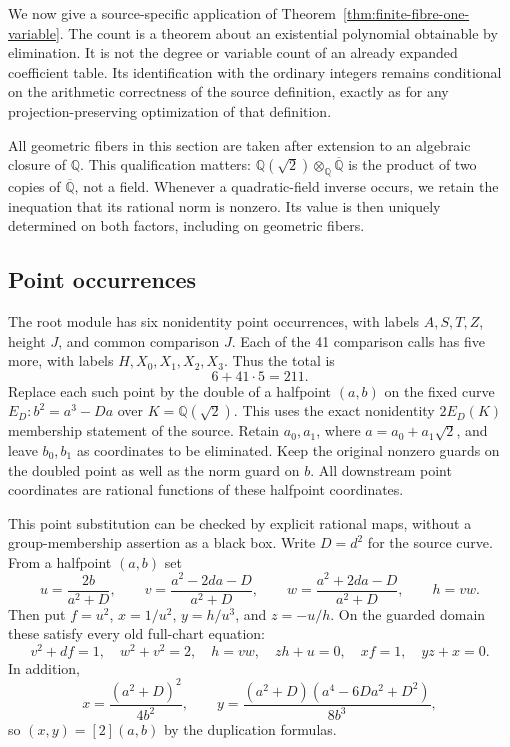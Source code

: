\documentclass[11pt]{article}
\theoremstyle{definition}
\begin{document}
We now give a source-specific application of
Theorem~\ref{thm:finite-fibre-one-variable}.  The count is a theorem
about an existential polynomial obtainable by elimination.  It is not
the degree or variable count of an already expanded coefficient table.
Its identification with the ordinary integers remains conditional on
the arithmetic correctness of the source definition, exactly as for
any projection-preserving optimization of that definition.

All geometric fibers in this section are taken after extension to an
algebraic closure of $\mathbb Q$.  This qualification matters:
$\mathbb Q(\sqrt2)\otimes_{\mathbb Q}\overline{\mathbb Q}$ is the
product of two copies of $\overline{\mathbb Q}$, not a field.
Whenever a quadratic-field inverse occurs, we retain the inequation
that its rational norm is nonzero.  Its value is then uniquely determined
on both factors, including on geometric fibers.

\subsection{Point occurrences}

The root module has six nonidentity point occurrences, with labels
$A,S,T,Z$, height $J$, and common comparison $J$.  Each of the 41
comparison calls has five more, with labels $H,X_0,X_1,X_2,X_3$.
Thus the total is
\[
 6+41\cdot5=211.
\]
Replace each such point by the double of a halfpoint $(a,b)$ on
the fixed curve $E_D:b^2=a^3-Da$ over $K=\mathbb Q(\sqrt2)$.
This uses the exact nonidentity $2E_D(K)$ membership statement of the
source.  Retain $a_0,a_1$, where $a=a_0+a_1\sqrt2$, and leave
$b_0,b_1$ as coordinates to be eliminated.  Keep the original
nonzero guards on the doubled point as well as the norm guard on $b$.
All downstream point coordinates are rational functions of these
halfpoint coordinates.

This point substitution can be checked by explicit rational maps,
without a group-membership assertion as a black box.  Write $D=d^2$
for the source curve.  From a halfpoint $(a,b)$ set
\[
 u=\frac{2b}{a^2+D},\qquad
 v=\frac{a^2-2da-D}{a^2+D},\qquad
 w=\frac{a^2+2da-D}{a^2+D},\qquad h=vw.
\]
Then put $f=u^2$, $x=1/u^2$, $y=h/u^3$, and $z=-u/h$.
On the guarded domain these satisfy every old full-chart equation:
\[
 v^2+df=1,\quad w^2+v^2=2,\quad h=vw,\quad
 zh+u=0,\quad xf=1,\quad yz+x=0.
\]
In addition,
\[
 x=\frac{(a^2+D)^2}{4b^2},\qquad
 y=\frac{(a^2+D)(a^4-6Da^2+D^2)}{8b^3},
\]
so $(x,y)=[2](a,b)$ by the duplication formulas.
\end{document}
